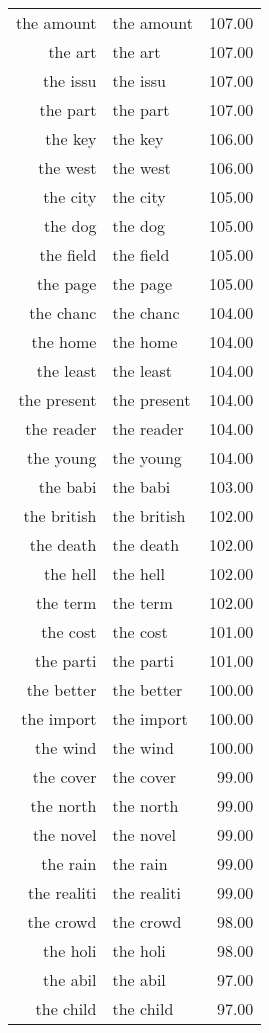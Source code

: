 \begin{table}[ht]
\begin{tabular}{rlr}
  the amount & the amount & 107.00 \\ 
  the art & the art & 107.00 \\ 
  the issu & the issu & 107.00 \\ 
  the part & the part & 107.00 \\ 
  the key & the key & 106.00 \\ 
  the west & the west & 106.00 \\ 
  the city & the city & 105.00 \\ 
  the dog & the dog & 105.00 \\ 
  the field & the field & 105.00 \\ 
  the page & the page & 105.00 \\ 
  the chanc & the chanc & 104.00 \\ 
  the home & the home & 104.00 \\ 
  the least & the least & 104.00 \\ 
  the present & the present & 104.00 \\ 
  the reader & the reader & 104.00 \\ 
  the young & the young & 104.00 \\ 
  the babi & the babi & 103.00 \\ 
  the british & the british & 102.00 \\ 
  the death & the death & 102.00 \\ 
  the hell & the hell & 102.00 \\ 
  the term & the term & 102.00 \\ 
  the cost & the cost & 101.00 \\ 
  the parti & the parti & 101.00 \\ 
  the better & the better & 100.00 \\ 
  the import & the import & 100.00 \\ 
  the wind & the wind & 100.00 \\ 
  the cover & the cover & 99.00 \\ 
  the north & the north & 99.00 \\ 
  the novel & the novel & 99.00 \\ 
  the rain & the rain & 99.00 \\ 
  the realiti & the realiti & 99.00 \\ 
  the crowd & the crowd & 98.00 \\ 
  the holi & the holi & 98.00 \\ 
  the abil & the abil & 97.00 \\ 
  the child & the child & 97.00 \\ 

\end{tabular}
\end{table}
